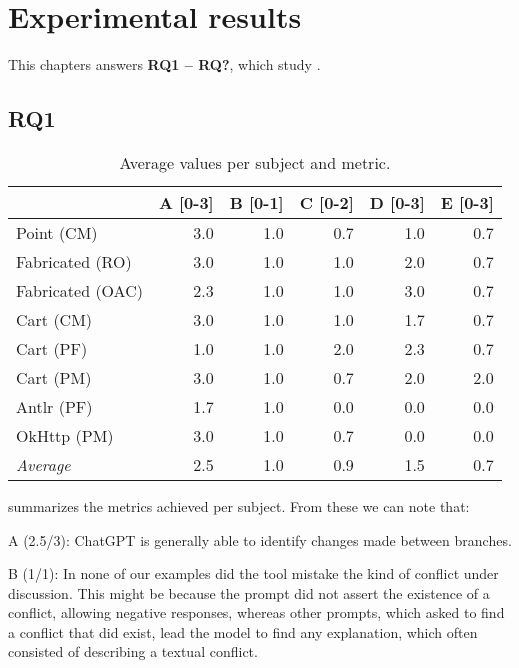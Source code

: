     \chapter{Experimental results}\label{chap:results}

This chapters answers \textbf{RQ1 – RQ?}, which study .

\section{RQ1}\label{sec:results:rq1}

\begin{table}[t]
\centering
\begin{tabular}{@{\extracolsep{\fill}} lrrrrr} \toprule
                 & A [0-3] & B [0-1] & C [0-2] & D [0-3] & E [0-3] \\
\midrule
Point (CM)       & 3.0 & 1.0 & 0.7 & 1.0 & 0.7 \\
Fabricated (RO)  & 3.0 & 1.0 & 1.0 & 2.0 & 0.7 \\
Fabricated (OAC) & 2.3 & 1.0 & 1.0 & 3.0 & 0.7 \\
Cart (CM)        & 3.0 & 1.0 & 1.0 & 1.7 & 0.7 \\
Cart (PF)        & 1.0 & 1.0 & 2.0 & 2.3 & 0.7 \\
Cart (PM)        & 3.0 & 1.0 & 0.7 & 2.0 & 2.0 \\
Antlr (PF)       & 1.7 & 1.0 & 0.0 & 0.0 & 0.0 \\
OkHttp (PM)      & 3.0 & 1.0 & 0.7 & 0.0 & 0.0 \\
\midrule
\textit{Average}  & 2.5 & 1.0 & 0.9 & 1.5 & 0.7 \\
\bottomrule
\end{tabular}
\caption{Average values per subject and metric.\label{tab:results:rq1}}
\end{table}

 summarizes the metrics achieved per subject. From these we can note that:

A (2.5/3): ChatGPT is generally able to identify changes made between branches.

B (1/1): In none of our examples did the tool mistake the kind of conflict under discussion. This might be because the prompt did not assert the existence of a conflict, allowing negative responses, whereas other prompts, which asked to find a conflict that did exist, lead the model to find any explanation, which often consisted of describing a textual conflict.

